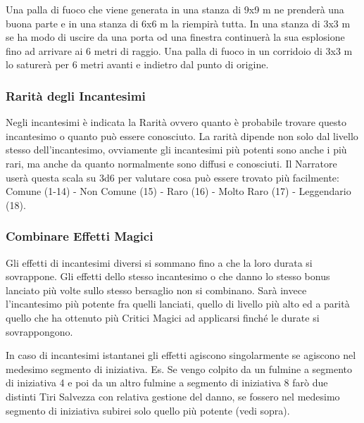 \begin{multicols}{2}
\begin{itemize}[leftmargin=*]
Una palla di fuoco che viene generata in una stanza di 9x9 m ne prenderà una buona parte e in una stanza di 6x6 m la riempirà tutta. In una stanza di 3x3 m se ha modo di uscire da una porta od una finestra continuerà la sua esplosione fino ad arrivare ai 6 metri di raggio. Una palla di fuoco in un corridoio di 3x3 m lo saturerà per 6 metri avanti e indietro dal punto di origine.

\end{itemize}

\subsubsection{Rarità degli Incantesimi}\label{magieraritaincantesimi}

Negli incantesimi è indicata la Rarità ovvero quanto è probabile trovare questo incantesimo o quanto può essere conosciuto. La rarità dipende non solo dal livello stesso dell'incantesimo, ovviamente gli incantesimi più potenti sono anche i più rari, ma anche da quanto normalmente sono diffusi e conosciuti. Il Narratore userà questa scala su 3d6 per valutare cosa può essere trovato più facilmente: %
Comune (1-14) - Non Comune (15) - Raro (16) - Molto Raro (17) - Leggendario (18).

\subsubsection{Combinare Effetti Magici}\label{magiecombinareeffettimagici}

Gli effetti di incantesimi diversi si sommano fino a che la loro durata si sovrappone. Gli effetti dello stesso incantesimo o che danno lo stesso bonus lanciato più volte sullo stesso bersaglio non si combinano. Sarà invece l'incantesimo più potente fra quelli lanciati, quello di livello più alto ed a parità quello che ha ottenuto più Critici Magici ad applicarsi finché le durate si sovrappongono.

In caso di incantesimi istantanei gli effetti agiscono singolarmente se agiscono nel medesimo segmento di iniziativa. Es. Se vengo colpito da un fulmine a segmento di iniziativa 4 e poi da un altro fulmine a segmento di iniziativa 8 farò due distinti Tiri Salvezza con relativa gestione del danno, se fossero nel medesimo segmento di iniziativa subirei solo quello più potente (vedi sopra).


\end{multicols}
